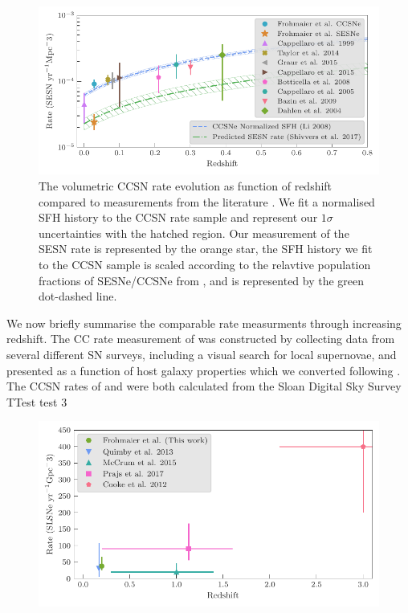 \documentclass[a4paper,fleqn,usenatbib]{mnras}
\begin{document}
\begin{figure}
	\includegraphics[width=\linewidth]{./allCC_Compare_Literature.pdf}
    \caption{The volumetric CCSN rate evolution as function of redshift compared to measurements from the literature \citep{1999A&A...351..459C,2014ApJ...792..135T,2015MNRAS.450..905G,2015A&A...584A..62C,2008A&A...479...49B,2005A&A...430...83C,2009A&A...499..653B,2004ApJ...613..189D}. We fit a normalised SFH history \citep[blue dashed line;][]{2008MNRAS.388.1487L} to the CCSN rate sample and represent our $1\sigma$ uncertainties with the hatched region. Our measurement of the SESN rate is represented by the orange star, the SFH history we fit to the CCSN sample is scaled according to the relavtive population fractions of SESNe/CCSNe from \citet{2017PASP..129e4201S}, and is represented by the green dot-dashed line.}
    \label{fig:rates_CC_lit}
\end{figure}

We now briefly summarise the comparable rate measurments through increasing redshift. The CC rate measurement of \citet{1999A&A...351..459C} was constructed by collecting data from several different SN surveys, including a visual search for local supernovae, and presented as a function of host galaxy properties which we converted following \citet{2008A&A...479...49B}. The CCSN rates of \citet{2014ApJ...792..135T} and \citet{2015MNRAS.450..905G} were both calculated from the Sloan Digital Sky Survey %
TTest test 3

\begin{figure}
	\includegraphics[width=\linewidth]{./SLSN_Compare_Literature.pdf}
    \caption{}
    \label{fig:rates_SLSN_Lit}
\end{figure}
\end{document}
